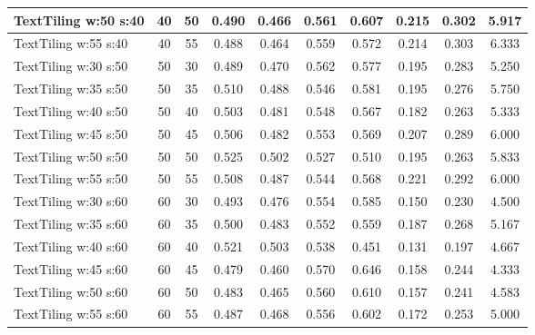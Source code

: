 \documentclass{article}
\begin{document}
\begin{longtable}[c]{|l|c|c|c|c|c|c|c|c|c|}
 TextTiling w:50 s:40 & 40 & 50 & 0.490 & 0.466 & 0.561 & 0.607 & 0.215 & 0.302 & 5.917  \\ \hline 
 TextTiling w:55 s:40 & 40 & 55 & 0.488 & 0.464 & 0.559 & 0.572 & 0.214 & 0.303 & 6.333  \\ \hline 
 TextTiling w:30 s:50 & 50 & 30 & 0.489 & 0.470 & 0.562 & 0.577 & 0.195 & 0.283 & 5.250  \\ \hline 
 TextTiling w:35 s:50 & 50 & 35 & 0.510 & 0.488 & 0.546 & 0.581 & 0.195 & 0.276 & 5.750  \\ \hline 
 TextTiling w:40 s:50 & 50 & 40 & 0.503 & 0.481 & 0.548 & 0.567 & 0.182 & 0.263 & 5.333  \\ \hline 
 TextTiling w:45 s:50 & 50 & 45 & 0.506 & 0.482 & 0.553 & 0.569 & 0.207 & 0.289 & 6.000  \\ \hline 
 TextTiling w:50 s:50 & 50 & 50 & 0.525 & 0.502 & 0.527 & 0.510 & 0.195 & 0.263 & 5.833  \\ \hline 
 TextTiling w:55 s:50 & 50 & 55 & 0.508 & 0.487 & 0.544 & 0.568 & 0.221 & 0.292 & 6.000  \\ \hline 
 TextTiling w:30 s:60 & 60 & 30 & 0.493 & 0.476 & 0.554 & 0.585 & 0.150 & 0.230 & 4.500  \\ \hline 
 TextTiling w:35 s:60 & 60 & 35 & 0.500 & 0.483 & 0.552 & 0.559 & 0.187 & 0.268 & 5.167  \\ \hline 
 TextTiling w:40 s:60 & 60 & 40 & 0.521 & 0.503 & 0.538 & 0.451 & 0.131 & 0.197 & 4.667  \\ \hline 
 TextTiling w:45 s:60 & 60 & 45 & 0.479 & 0.460 & 0.570 & 0.646 & 0.158 & 0.244 & 4.333  \\ \hline 
 TextTiling w:50 s:60 & 60 & 50 & 0.483 & 0.465 & 0.560 & 0.610 & 0.157 & 0.241 & 4.583  \\ \hline 
 TextTiling w:55 s:60 & 60 & 55 & 0.487 & 0.468 & 0.556 & 0.602 & 0.172 & 0.253 & 5.000  \\ \hline 
 \end{longtable} 
\newpage
\end{document}
